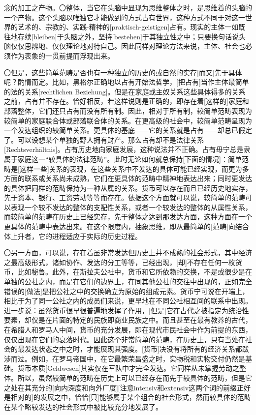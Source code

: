 \documentclass[a4paper,twoside,12pt]{ctexart}
\begin{document}
念的加工之产物。〇整体，当它在头脑中显现为思维整体之时，是思维着的头脑的一个产物。这个头脑以唯独它才能做到的方式占有世界，这种方式不同于对这一世界的艺术的、宗教的、实践-精神的[praktisch-geistigen]占有。现实的主体一如既往地存续[bleiben]于头脑之外，坚持[bestehen]于其独立性之中；只要换句话说头脑仅仅思辨地、仅仅理论地对待自己。因此同样对理论方法来说，主体、社会也必须作为表象的一贯前提而浮现出来。

〇但是，这些简单范畴是否也有一种独立的历史的或自然的实存[而又]先于具体呢？酌情而定。比如，黑格尔正确地以占有开始法哲学，[把占有]当作主体最简单的法的关系[rechtlichen Beziehung]。但是在家庭或主奴关系这些具体得多的关系之前，占有并不存在。恰好相反，若这样说则是正确的，即存在着[这样的]家庭和部落整体，它们还只占有而没有所有制。因此，相对于所有制，较简单范畴表现为较简单的家庭联合体或部落联合体的关系。在更高级的社会中，较简单范畴呈现为一个发达组织的较简单关系。更具体的基底——它的关系就是占有——却总已假定了。可以设想某个单独的野人拥有财产。那么占有却不是法律关系[Rechtsverhältnis]。占有历史地向家庭发展，这种说法并不正确。占有毋宁总是隶属于家庭这一“较具体的法律范畴”。此时无论如何就总保持[下面的情况]：简单范畴是[这样一些]关系的表现，在这些关系中不发达的具体可能已经实现，而更为多方面的联系或关系尚未成熟，它们在更具体的范畴中精神地表达出来；同时更发达的具体把同样的范畴保持为一种从属的关系。货币可以存在而且已经历史地实存，先于资本、银行、工资劳动等等而存在。依据这个方面就可以说，较简单的范畴可以表现一个较不发达的整体的支配性关系，或者一个较发达的整体的从属性关系，而较简单的范畴在历史上已经实存，先于整体之达到那发达方面，这种方面在一个更具体的范畴中表达出来。在这个限度内，抽象思维，即从最简单的[范畴]向结合体上升者，它的进程适应于实际的历史过程。

〇另一方面，可以说，存在着虽非常发达但历史上并不成熟的社会形式，其中经济之最高级形式，诸如协作、发达的分工等等，已经出现，[却]不存在任何一枚货币，比如秘鲁。此外，在斯拉夫公社中，货币和它所依赖的交换，不是或很少是在单独的公社之内，而是在它们的边界上，在同其他公社的交往中出现的，正如完全错误的[做法]是把公社之中的交换确立为原始的组成元素。货币宁可说在开端上，相比于为了同一公社之内的成员们来说，更早地在不同公社相互间的联系中出现。进一步说：虽然货币很早很普遍地发挥了作用，[但是]它在古代之被指定为统治性要素，却仅是在片面的特定的民族即商业民族之中。而且甚至在最有教养的古代，在希腊人和罗马人中间，货币的充分发展，即在现代市民社会中作为前提的东西，仅仅出现在它们的衰落时代。因此这个非常简单的范畴，在历史上，只有当处在社会的最发达状态之中之时，才能展现其强度。[货币]决没有将所有的经济关系都跋涉而过。例如，在罗马帝国中，在它最繁荣昌盛之时，实物税和实物交付仍然是基础。货币本质[Geldwesen]其实仅在军队中才完全发达。它同样从未掌握劳动之整体。所以，虽然较简单的范畴在历史上可以已经存在而先于较具体的范畴，但是它之处在其充分的[向内深度和向外广度][注意intensiv和extensiv这两个词的前缀正好是相对的]的发展之中，恰恰[只]能够属于某个组合的社会形式，然而较具体的范畴在某个略较发达的社会形式中被比较充分地发展了。
\end{document}
